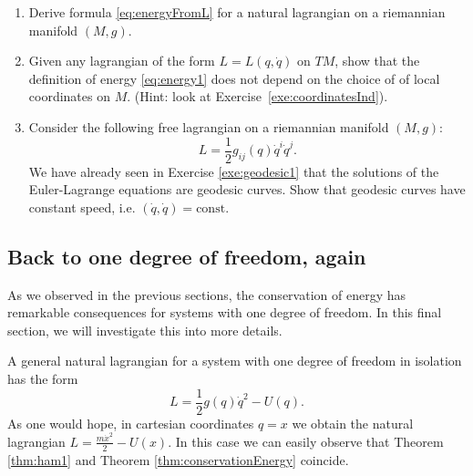 \documentclass[english,fontsize=11pt,paper=a5,oneside]{scrbook}
\let\d\relax
\DeclareMathOperator{\d}{d}
\theoremstyle{definition}
\newenvironment{exercise}
  {\pushQED{\qed}\renewcommand{\qedsymbol}{$\maltese$}\exercisex}
  {\popQED\endexercisex}
\begin{document}
\begin{exercise}
    \begin{enumerate}
        \item Derive formula \eqref{eq:energyFromL} for a natural lagrangian on a riemannian manifold $(M,g)$.
        \item Given any lagrangian of the form $L = L(q, \dot q)$ on $TM$, show that the definition of energy \eqref{eq:energy1} does not depend on the choice of of local coordinates on $M$. (Hint: look at Exercise~\ref{exe:coordinatesInd}).
        \item Consider the following free lagrangian on a riemannian manifold $(M, g)$:
        \begin{equation}
            L = \frac12 g_{ij}(q)\dot q^i \dot q^j.
        \end{equation}
        We have already seen in Exercise \ref{exe:geodesic1} that the solutions of the Euler-Lagrange equations are geodesic curves.
        Show that geodesic curves have constant speed, i.e. $(\dot q, \dot q) = \mathrm{const}$.
    \end{enumerate}
\end{exercise}




\subsection{Back to one degree of freedom, again}\label{sec:1deg-again}

As we observed in the previous sections, the conservation of energy has remarkable consequences for systems with one degree of freedom.
In this final section, we will investigate this into more details.

A general natural lagrangian for a system with one degree of freedom in isolation has the form
\begin{equation}
    L = \frac12 g(q)\dot q^2 - U(q).
\end{equation}
As one would hope, in cartesian coordinates $q = x$ we obtain the natural lagrangian $L = \frac{m \dot x^2}{2} - U(x)$.
In this case we can easily observe that Theorem \ref{thm:ham1} and Theorem \ref{thm:conservationEnergy} coincide.
\end{document}
